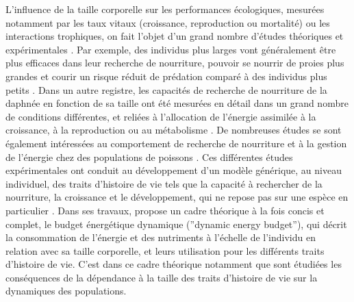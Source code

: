 L'influence de la taille corporelle sur les performances écologiques, mesurées
notamment par les taux vitaux (croissance, reproduction ou mortalité) ou les
interactions trophiques, on fait l'objet d'un grand nombre d'études théoriques
et expérimentales
\autocite[][,\ldots]{peters1986a,calder1996a,de-roos2001a,claessen2004a}. Par
exemple, des individus plus larges vont généralement être plus efficaces dans
leur recherche de nourriture, pouvoir se nourrir de proies plus grandes et
courir un risque réduit de prédation comparé à des individus plus petits
\autocite{paradis1996a}.
Dans un autre registre, les capacités de recherche de nourriture de la daphnée
en fonction de sa taille ont été mesurées en détail dans un grand nombre de
conditions différentes, et reliées à l'allocation de l'énergie assimilée à la
croissance, à la reproduction ou au métabolisme \autocite[par ex.
][]{lampert1978a,gurney1990a,mccauley1990a,kooijman2000a}. De nombreuses études
se sont également intéressées au comportement de recherche de nourriture et à la
gestion de l'énergie chez des populations de poissons \autocite[par ex.
][]{elliott1975a,mittelbach1981a,fuiman1994a,hjelm2001a}. Ces différentes études
expérimentales ont conduit au développement d'un modèle générique, au niveau
individuel, des traits d'histoire de vie tels que la capacité à rechercher de la
nourriture, la croissance et le développement, qui ne repose pas sur une espèce
en particulier \autocite{kooijman2000a,nisbet2000a,west2001a}. Dans ses travaux,
\textcite{kooijman2000a} propose un cadre théorique à la fois concis et
complet, le budget énergétique dynamique (''dynamic energy budget''), qui décrit
la consommation  de l'énergie et des nutriments à l'échelle de l'individu en
relation avec sa taille corporelle, et leurs utilisation pour les différents
traits d'histoire de vie. C'est dans ce cadre théorique notamment que sont
étudiées les conséquences de la dépendance à la taille des traits d'histoire de
vie sur la dynamiques des populations.

